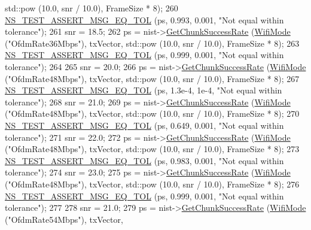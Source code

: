 \begin{DoxyCode}
      std::pow (10.0, snr / 10.0), FrameSize * 8);
260   \hyperlink{group__testing_ga9e7861b56b4e70db3b56044cb7a28e41}{NS\_TEST\_ASSERT\_MSG\_EQ\_TOL} (ps, 0.993, 0.001, \textcolor{stringliteral}{"Not equal within tolerance"});
261   snr = 18.5;
262   ps = nist->\hyperlink{classns3_1_1NistErrorRateModel_a2316a2c287485d7cc81198c90b246bc0}{GetChunkSuccessRate} (\hyperlink{classns3_1_1WifiMode}{WifiMode} (\textcolor{stringliteral}{"OfdmRate36Mbps"}), txVector, 
      std::pow (10.0, snr / 10.0), FrameSize * 8);
263   \hyperlink{group__testing_ga9e7861b56b4e70db3b56044cb7a28e41}{NS\_TEST\_ASSERT\_MSG\_EQ\_TOL} (ps, 0.999, 0.001, \textcolor{stringliteral}{"Not equal within tolerance"});
264 
265   snr = 20.0;
266   ps = nist->\hyperlink{classns3_1_1NistErrorRateModel_a2316a2c287485d7cc81198c90b246bc0}{GetChunkSuccessRate} (\hyperlink{classns3_1_1WifiMode}{WifiMode} (\textcolor{stringliteral}{"OfdmRate48Mbps"}), txVector, 
      std::pow (10.0, snr / 10.0), FrameSize * 8);
267   \hyperlink{group__testing_ga9e7861b56b4e70db3b56044cb7a28e41}{NS\_TEST\_ASSERT\_MSG\_EQ\_TOL} (ps, 1.3e-4, 1e-4, \textcolor{stringliteral}{"Not equal within tolerance"});
268   snr = 21.0;
269   ps = nist->\hyperlink{classns3_1_1NistErrorRateModel_a2316a2c287485d7cc81198c90b246bc0}{GetChunkSuccessRate} (\hyperlink{classns3_1_1WifiMode}{WifiMode} (\textcolor{stringliteral}{"OfdmRate48Mbps"}), txVector, 
      std::pow (10.0, snr / 10.0), FrameSize * 8);
270   \hyperlink{group__testing_ga9e7861b56b4e70db3b56044cb7a28e41}{NS\_TEST\_ASSERT\_MSG\_EQ\_TOL} (ps, 0.649, 0.001, \textcolor{stringliteral}{"Not equal within tolerance"});
271   snr = 22.0;
272   ps = nist->\hyperlink{classns3_1_1NistErrorRateModel_a2316a2c287485d7cc81198c90b246bc0}{GetChunkSuccessRate} (\hyperlink{classns3_1_1WifiMode}{WifiMode} (\textcolor{stringliteral}{"OfdmRate48Mbps"}), txVector, 
      std::pow (10.0, snr / 10.0), FrameSize * 8);
273   \hyperlink{group__testing_ga9e7861b56b4e70db3b56044cb7a28e41}{NS\_TEST\_ASSERT\_MSG\_EQ\_TOL} (ps, 0.983, 0.001, \textcolor{stringliteral}{"Not equal within tolerance"});
274   snr = 23.0;
275   ps = nist->\hyperlink{classns3_1_1NistErrorRateModel_a2316a2c287485d7cc81198c90b246bc0}{GetChunkSuccessRate} (\hyperlink{classns3_1_1WifiMode}{WifiMode} (\textcolor{stringliteral}{"OfdmRate48Mbps"}), txVector, 
      std::pow (10.0, snr / 10.0), FrameSize * 8);
276   \hyperlink{group__testing_ga9e7861b56b4e70db3b56044cb7a28e41}{NS\_TEST\_ASSERT\_MSG\_EQ\_TOL} (ps, 0.999, 0.001, \textcolor{stringliteral}{"Not equal within tolerance"});
277 
278   snr = 21.0;
279   ps = nist->\hyperlink{classns3_1_1NistErrorRateModel_a2316a2c287485d7cc81198c90b246bc0}{GetChunkSuccessRate} (\hyperlink{classns3_1_1WifiMode}{WifiMode} (\textcolor{stringliteral}{"OfdmRate54Mbps"}), txVector, 

\end{DoxyCode}
